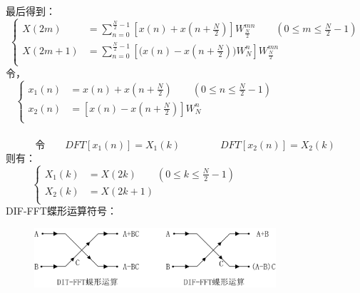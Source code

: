 \documentclass[notheorems,compress,mathserif,table]{beamer}
\begin{document}
\begin{frame}\frametitle{}%


最后得到：
\begin{equation*} \label{eq:2}
\left \{
\begin{aligned}
    X(2m)\quad &= \sum_{n=0}^{\frac{N}{2}-1}\left[x(n)+x(n+\frac{N}{2})\right]W_{\frac{N}{2}}^{mn} \quad\quad(0\leq m\leq\frac{N}{2}-1)\\
    X(2m+1)    &= \sum_{n=0}^{\frac{N}{2}-1}\left[\Big(x(n)-x(n+\frac{N}{2})\Big)W_N^n \right]W_{\frac{N}{2}}^{mn}\\
\end{aligned}
\right.
\end{equation*}
令，
$$
\left \{
\begin{aligned}
    x_1(n)&= x(n)+x(n+\frac{N}{2})\quad\quad(0\leq n\leq\frac{N}{2}-1)\quad\quad\quad\quad\quad\quad\quad\quad\\
    x_2(n)&= \left[x(n)-x(n+\frac{N}{2})\right]W_N^n\\
\end{aligned}
\right.
$$
\end{frame}
\begin{frame}\frametitle{}%
$$\mbox{令}\quad\quad DFT[x_1(n)]=X_1(k)\quad\quad\quad\quad DFT\left[x_2(n)\right]=X_2(k)$$
则有：
$$
\left \{
\begin{aligned}
    X_1(k)&= X(2k)\quad\quad(0\leq k\leq\frac{N}{2}-1)
    \quad\quad\quad\quad\quad\quad\quad\quad\quad\quad\\
    X_2(k)&= X(2k+1)\\
\end{aligned}
\right.
$$
DIF-FFT蝶形运算符号：
\begin{figure}[h]
  \centering
  \includegraphics[width=0.8\textwidth]{Diffftdiexing.jpg}
\end{figure}
\end{frame}
\end{document}
